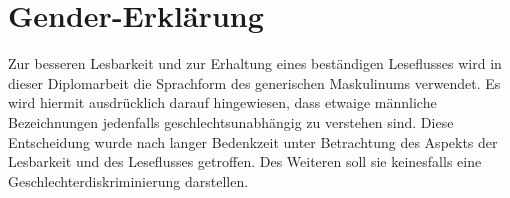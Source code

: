 
\chapter*{Gender-Erklärung}

Zur besseren Lesbarkeit und zur Erhaltung eines beständigen Leseflusses wird in dieser Diplomarbeit die Sprachform des generischen Maskulinums verwendet. Es wird hiermit ausdrücklich darauf hingewiesen, dass etwaige männliche Bezeichnungen jedenfalls geschlechtsunabhängig zu verstehen sind. Diese Entscheidung wurde nach langer Bedenkzeit unter Betrachtung des Aspekts der Lesbarkeit und des Leseflusses getroffen. Des Weiteren soll sie keinesfalls eine Geschlechterdiskriminierung darstellen.